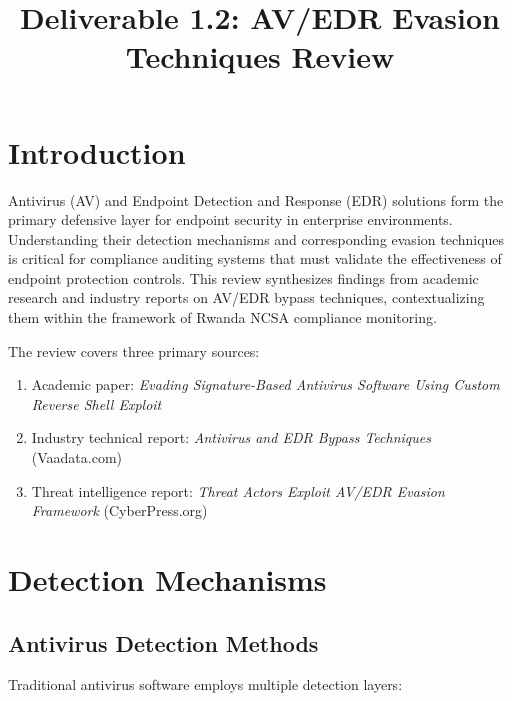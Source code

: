\documentclass[11pt,conference]{IEEEtran}
\begin{document}
\title{Deliverable 1.2: AV/EDR Evasion Techniques Review}

\author{
}

\maketitle

\section{Introduction}

Antivirus (AV) and Endpoint Detection and Response (EDR) solutions form the primary defensive layer for endpoint security in enterprise environments. Understanding their detection mechanisms and corresponding evasion techniques is critical for compliance auditing systems that must validate the effectiveness of endpoint protection controls. This review synthesizes findings from academic research and industry reports on AV/EDR bypass techniques, contextualizing them within the framework of Rwanda NCSA compliance monitoring.

The review covers three primary sources:
\begin{enumerate}
    \item Academic paper: \textit{Evading Signature-Based Antivirus Software Using Custom Reverse Shell Exploit}
    \item Industry technical report: \textit{Antivirus and EDR Bypass Techniques} (Vaadata.com)
    \item Threat intelligence report: \textit{Threat Actors Exploit AV/EDR Evasion Framework} (CyberPress.org)
\end{enumerate}

\section{Detection Mechanisms}

\subsection{Antivirus Detection Methods}

Traditional antivirus software employs multiple detection layers:
\end{document}

